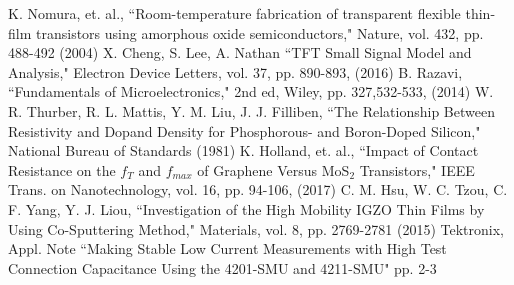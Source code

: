 \documentclass[conference]{IEEEtran}
\begin{document}
\begin{thebibliography}{00}
     K. Nomura, et. al., ``Room-temperature fabrication of transparent flexible thin-film transistors using amorphous oxide semiconductors," Nature, vol. 432, pp. 488-492 (2004)
     X. Cheng, S. Lee, A. Nathan ``TFT Small Signal Model and Analysis," Electron Device Letters, vol. 37, pp. 890-893, (2016)
     B. Razavi, ``Fundamentals of Microelectronics," 2nd ed, Wiley, pp. 327,532-533, (2014)
     W. R. Thurber, R. L. Mattis, Y. M. Liu, J. J. Filliben, ``The Relationship Between Resistivity and Dopand Density for Phosphorous- and Boron-Doped Silicon," National Bureau of Standards (1981)
     K. Holland, et. al., ``Impact of Contact Resistance on the $f_T$ and $f_{max}$ of Graphene Versus MoS$_2$ Transistors," IEEE Trans. on Nanotechnology, vol. 16, pp. 94-106, (2017)
     C. M. Hsu, W. C. Tzou, C. F. Yang, Y. J. Liou, ``Investigation of the High Mobility IGZO Thin Films by Using Co-Sputtering Method," Materials, vol. 8, pp. 2769-2781 (2015)
     Tektronix, Appl. Note ``Making Stable Low Current Measurements with High Test Connection Capacitance Using the 4201-SMU and 4211-SMU" pp. 2-3
\end{thebibliography}
\end{document}
